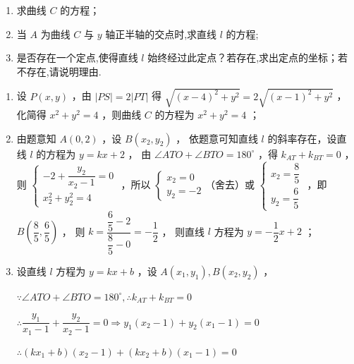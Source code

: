 \begin{enumerate}
    \begin{enumerate}
        \item 求曲线 $C$ 的方程；
        \item 当 ${A}$ 为曲线 $C$ 与 $y$ 轴正半轴的交点时,求直线 $l$ 的方程;
        \item 是否存在一个定点,使得直线 $l$ 始终经过此定点？若存在,求出定点的坐标；若不存在,请说明理由. 
    \end{enumerate}
    \begin{jieda}
        \begin{enumerate}
            \item 设 ${P}({x}, {y})$ ，由 $|P S|=2|P T|$ 得 $\sqrt{(x-4)^2+y^2}=2 \sqrt{(x-1)^2+y^2}$ ，化简得 $x^2+y^2=4$ ，则曲线 $C$ 的方程为 $x^2+y^2=4$ ；
            \item 由题意知 $A(0,2)$ ，设 ${B}\left({x}_2, {y}_2\right)$ ，
            依题意可知直线 $l$ 的斜率存在，设直线 $l$ 的方程为 $y=k x+2$ ，
            由 $\angle A T O+\angle B T O=180^{\circ}$ ，得 $k_{A T}+k_{B T}=0$ ，
            则 $\left\{\begin{array}{l}-2+\dfrac{y_2}{x_2-1}=0 \\ x_2^2+y_2^2=4\end{array}\right.$ ，所以 $\left\{\begin{array}{l}x_2=0 \\ y_2=-2\end{array}\right.$（舍去）或 $\left\{\begin{array}{l}x_2=\dfrac{8}{5} \\ y_2=\dfrac{6}{5}\end{array}\right.$ ，即 $B\left(\dfrac{8}{5}, \dfrac{6}{5}\right)$ ，
            则 $k=\dfrac{\dfrac{6}{5}-2}{\dfrac{8}{5}-0}=-\dfrac{1}{2}$ ，
            则直线 $l$ 方程为 $y=-\dfrac{1}{2} x+2$ ；
            
            
            \item 设直线 $l$ 方程为 $y=k x+b$ ，设 ${A}\left({x}_1, {y}_1\right), {B}\left({x}_2, {y}_2\right)$ ，
            
            $\because \angle A T O+\angle B T O=180^{\circ}, \therefore k_{A T}+k_{B T}=0$
            
            $\therefore \dfrac{y_1}{x_1-1}+\dfrac{y_2}{x_2-1}=0 \Longrightarrow y_1\left(x_2-1\right)+y_2\left(x_1-1\right)=0$
             
            $\therefore \left(k x_1+b\right)\left(x_2-1\right)+\left(k x_2+b\right)\left(x_1-1\right)=0$
            

\end{enumerate}
\end{jieda}
\end{enumerate}

